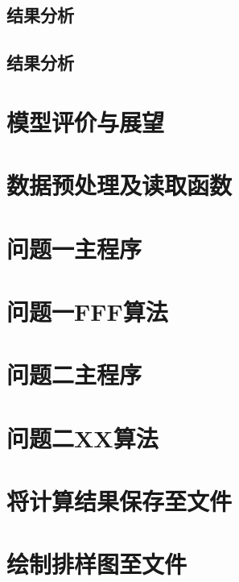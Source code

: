 \documentclass[bwprint]{gmcmthesis}
\begin{document}
\subsection{结果分析}

\subsection{结果分析}

\section{模型评价与展望}





\newpage
\quad
\newpage





\cite{mittelbach_latex_2004,wright_latex3_2009,beeton_unicode_2008,vieth_experiences_2009}

\newpage
\appendix
\setcounter{page}{1} %
\section{数据预处理及读取函数}

\section{问题一主程序}

\section{问题一FFF算法}

\section{问题二主程序}

\section{问题二XX算法}

\section{将计算结果保存至文件}

\section{绘制排样图至文件}

\end{document}
